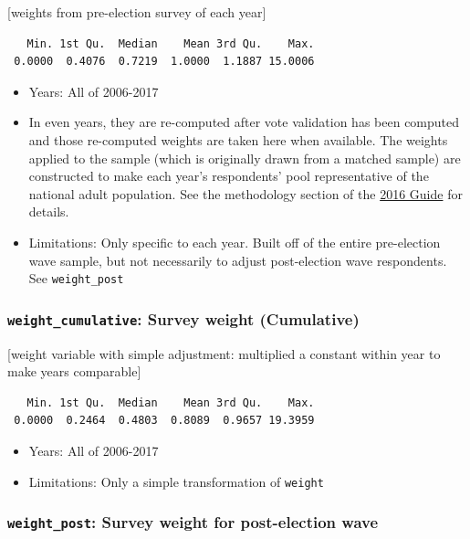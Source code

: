 \documentclass[10pt,article,oneside]{memoir}
\theoremstyle{definition}
\begin{document}
{[}weights from pre-election survey of each year{]}

\begin{verbatim}
   Min. 1st Qu.  Median    Mean 3rd Qu.    Max. 
 0.0000  0.4076  0.7219  1.0000  1.1887 15.0006 
\end{verbatim}

\begin{itemize}
\tightlist
\item
  Years: All of 2006-2017
\item
  In even years, they are re-computed after vote validation has been
  computed and those re-computed weights are taken here when available.
  The weights applied to the sample (which is originally drawn from a
  matched sample) are constructed to make each year's respondents' pool
  representative of the national adult population. See the methodology
  section of the
  \href{https://dataverse.harvard.edu/api/access/datafile/3047286}{2016
  Guide} for details.
\item
  Limitations: Only specific to each year. Built off of the entire
  pre-election wave sample, but not necessarily to adjust post-election
  wave respondents. See \texttt{weight\_post}
\end{itemize}

\hypertarget{weight_cumulative-survey-weight-cumulative}{%
\subsubsection{\texorpdfstring{\texttt{weight\_cumulative}: Survey
weight
(Cumulative)}{weight\_cumulative: Survey weight (Cumulative)}}\label{weight_cumulative-survey-weight-cumulative}}

{[}weight variable with simple adjustment: multiplied a constant within
year to make years comparable{]}

\begin{verbatim}
   Min. 1st Qu.  Median    Mean 3rd Qu.    Max. 
 0.0000  0.2464  0.4803  0.8089  0.9657 19.3959 
\end{verbatim}

\begin{itemize}
\tightlist
\item
  Years: All of 2006-2017
\item
  Limitations: Only a simple transformation of \texttt{weight}
\end{itemize}

\hypertarget{weight_post-survey-weight-for-post-election-wave}{%
\subsubsection{\texorpdfstring{\texttt{weight\_post}: Survey weight for
post-election
wave}{weight\_post: Survey weight for post-election wave}}\label{weight_post-survey-weight-for-post-election-wave}}
\end{document}
